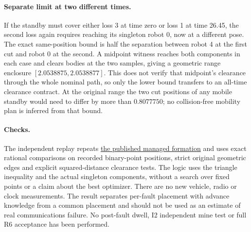 \documentclass{article}
\begin{document}
\paragraph{Separate limit at two different times.}
If the standby must cover either loss 3 at time zero or loss 1 at time 26.45, the second loss again requires reaching its singleton robot 0, now at a different pose. The exact same-position bound is half the separation between robot 4 at the first cut and robot 0 at the second. A midpoint witness reaches both components in each case and clears bodies at the two samples, giving a geometric range enclosure $[2.0538875,2.0538877]$. This does not verify that midpoint's clearance through the whole nominal path, so only the lower bound transfers to an all-time clearance contract. At the original range the two cut positions of any mobile standby would need to differ by more than $0.8077750$; no collision-free mobility plan is inferred from that bound.

\paragraph{Checks.}
The independent replay repeats \href{https://arxiv.org/html/2609.29939v1}{the published managed formation} and uses exact rational comparisons on recorded binary-point positions, strict original geometric edges and explicit squared-distance clearance tests. The logic uses the triangle inequality and the actual singleton components, without a search over fixed points or a claim about the best optimizer. There are no new vehicle, radio or clock measurements. The result separates per-fault placement with advance knowledge from a common placement and should not be used as an estimate of real communications failure. No post-fault dwell, I2 independent mine test or full R6 acceptance has been performed.
\end{document}
